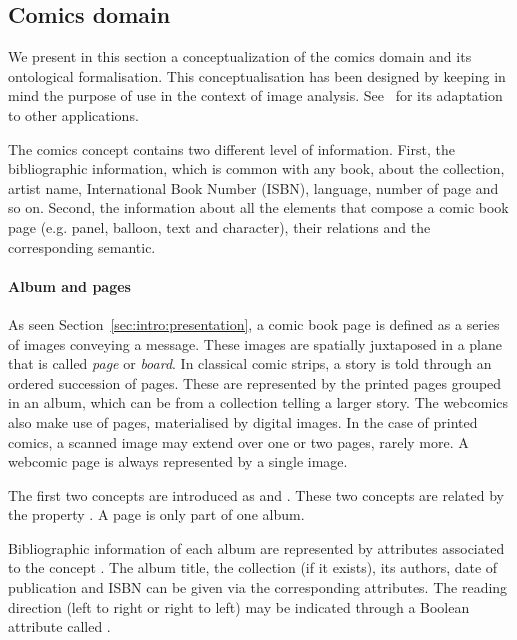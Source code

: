 
\subsection{Comics domain} %
\label{sub:kn:comics_domain}

We present in this section a conceptualization of the comics domain and its ontological formalisation.
This conceptualisation has been designed by keeping in mind the purpose of use in the context of image analysis.
See~\cite{phdthesisGuerin14} for its adaptation to other applications.

The comics concept contains two different level of information.
First, the bibliographic information, which is common with any book, about the collection, artist name, International Book Number (ISBN), language, number of page and so on.
Second, the information about all the elements that compose a comic book page (e.g. panel, balloon, text and character), their relations and the corresponding semantic.

\paragraph{Album and pages} %
\label{par:album_and_pages}

As seen Section~\ref{sec:intro:presentation}, a comic book page is defined as a series of images conveying a message.
These images are spatially juxtaposed in a plane that is called \emph{page} or \emph{board}.
In classical comic strips, a story is told through an ordered succession of pages.
These are represented by the printed pages grouped in an album, which can be from a collection telling a larger story.
The webcomics also make use of pages, materialised by digital images.
In the case of printed comics, a scanned image may extend over one or two pages, rarely more.
A webcomic page is always represented by a single image.

The first two concepts are introduced as  and .
These two concepts are related by the property .
A page is only part of one album.

Bibliographic information of each album are represented by attributes associated to the concept .
The album title, the collection (if it exists), its authors, date of publication and ISBN can be given via the corresponding attributes.
The reading direction (left to right or right to left) may be indicated through a Boolean attribute called .

